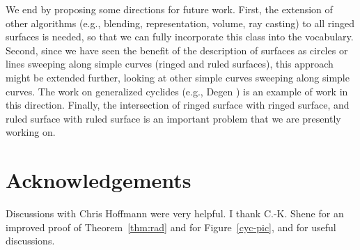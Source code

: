 We end by proposing some directions for future work.
First, the extension of other algorithms (e.g., blending, representation, 
volume, ray casting) to all ringed surfaces is needed,
so that we can fully incorporate this class into the vocabulary.
Second, since we have seen the benefit of the description of surfaces 
as circles or lines sweeping along simple curves (ringed and ruled surfaces),
this approach might be extended further, looking at other simple curves
sweeping along simple curves.
The work on generalized cyclides (e.g., Degen \cite{Degen90}) 
is an example of work in this direction.
Finally, the intersection of ringed surface with ringed surface, 
and ruled surface with ruled surface is an important problem that we are 
presently working on.


\section{Acknowledgements}

Discussions with Chris Hoffmann were very helpful.
I thank C.-K. Shene for an improved proof of Theorem~\ref{thm:rad} and
for Figure~\ref{cyc-pic},
and for useful discussions.





